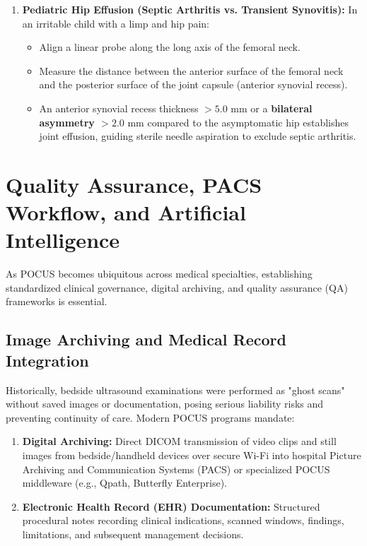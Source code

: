 \documentclass[11pt,a4paper]{article}
\begin{document}
\begin{enumerate}[leftmargin=2em]
\begin{itemize}
    \end{itemize}
    \item \textbf{Pediatric Hip Effusion (Septic Arthritis vs. Transient Synovitis):}
    In an irritable child with a limp and hip pain:
    \begin{itemize}
        \item Align a linear probe along the long axis of the femoral neck.
        \item Measure the distance between the anterior surface of the femoral neck and the posterior surface of the joint capsule (anterior synovial recess).
        \item An anterior synovial recess thickness \textbf{$> 5.0\text{ mm}$} or a \textbf{bilateral asymmetry $> 2.0\text{ mm}$} compared to the asymptomatic hip establishes joint effusion, guiding sterile needle aspiration to exclude septic arthritis.
    \end{itemize}
\end{enumerate}

\section{Quality Assurance, PACS Workflow, and Artificial Intelligence}
As POCUS becomes ubiquitous across medical specialties, establishing standardized clinical governance, digital archiving, and quality assurance (QA) frameworks is essential.

\subsection{Image Archiving and Medical Record Integration}
Historically, bedside ultrasound examinations were performed as "ghost scans" without saved images or documentation, posing serious liability risks and preventing continuity of care. Modern POCUS programs mandate:
\begin{enumerate}[leftmargin=2em]
    \item \textbf{Digital Archiving:} Direct DICOM transmission of video clips and still images from bedside/handheld devices over secure Wi-Fi into hospital Picture Archiving and Communication Systems (PACS) or specialized POCUS middleware (e.g., Qpath, Butterfly Enterprise).
    \item \textbf{Electronic Health Record (EHR) Documentation:} Structured procedural notes recording clinical indications, scanned windows, findings, limitations, and subsequent management decisions.
\end{enumerate}
\end{document}
